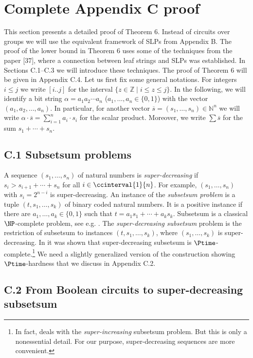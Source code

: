 \section*{Complete Appendix C proof}\setcounter{equation}{2}
This section presents a detailed proof of Theorem 6. Instead of circuits over groups we will use the equivalent framework of SLPs from Appendix B. The proof of the lower bound in Theorem 6 uses some of the techniques from the paper [37], where a connection between leaf strings and SLPs was established. In Sections C.1--C.3 we will introduce these techniques. The proof of Theorem 6 will be given in Appendix C.4.
Let us first fix some general notations. For integers $i\le j$ we write $[i..j]$ for the interval $\{z\in\mathbb Z\mid i\le z\le j\}$. In the following, we will identify a bit string $\alpha=a_1a_2\cdots a_n$ ($a_1,\ldots,a_n\in\{0,1\}$) with the vector $(a_1,a_2,\ldots,a_n)$. In particular, for another vector $\overline{s}=(s_1,\ldots,s_n)\in\mathbb N^n$ we will write $\alpha\cdot\overline{s}=\sum_{i=1}^n a_i\cdot s_i$ for the scalar product. Moreover, we write $\sum\overline{s}$ for the sum $s_1+\cdots+s_n$.
\subsection*{C.1 Subsetsum problems}  \label{sec-subsetsum}

A sequence $(s_1,\ldots,s_n)$ of natural numbers is
\emph{super-decreasing} if $s_i > s_{i+1}+ \cdots + s_n$ for all $i \in \ccinterval{1}{n}$. For example, $(s_1,\ldots,s_n)$
with $s_i=2^{n-i}$ is super-decreasing.
An instance of the \emph{subsetsum problem} is 
a tuple $(t,s_1,\ldots,s_k)$ of binary coded natural numbers.
It is a positive instance if there are $a_1, \ldots, a_k \in \{0,1\}$ such that
$t = a_1 s_1 + \cdots + a_k s_k$. 
Subsetsum is a classical $\NP$-complete problem, see e.g. \cite{ref15}.
The \emph{super-decreasing subsetsum} problem is the restriction 
of subsetsum to instances $(t,s_1,\ldots,s_k)$, where $(s_1, \ldots, s_k)$
is super-decreasing. In \cite{ref30} it was shown that super-decreasing 
subsetsum is $\Ptime$-complete.\footnote{In fact, \cite{ref30} deals with
the {\em super-increasing} subsetsum problem. But this is only a nonessential
detail. For our purpose, super-decreasing sequences are more convenient.} 
We need a slightly generalized version of the construction showing $\Ptime$-hardness 
that we discuss in Appendix C.2.


\subsection*{C.2 From Boolean circuits to super-decreasing subsetsum} \label{sec-circuits-subsetsum} 

